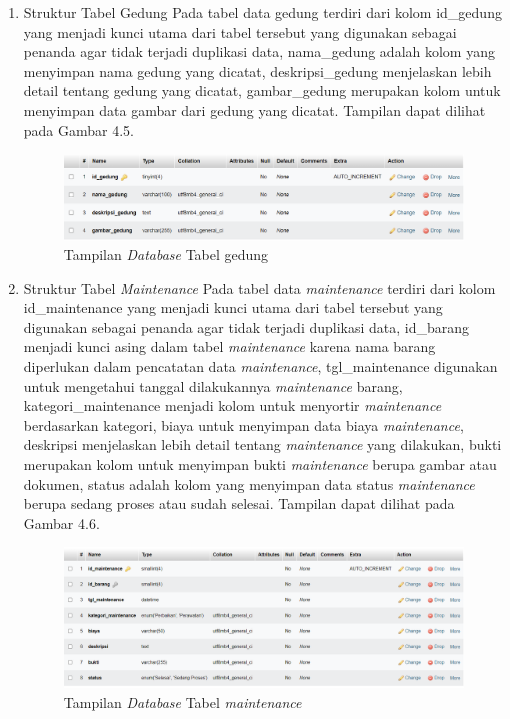 \begin{enumerate}
  \item Struktur Tabel Gedung
        Pada tabel data gedung terdiri dari kolom id\_gedung yang menjadi kunci utama dari tabel tersebut yang digunakan sebagai penanda agar tidak terjadi duplikasi data, nama\_gedung adalah kolom yang menyimpan nama gedung yang dicatat,  deskripsi\_gedung menjelaskan lebih detail tentang gedung yang dicatat, gambar\_gedung merupakan kolom untuk menyimpan data gambar dari gedung yang dicatat. Tampilan dapat dilihat pada Gambar 4.5.

        \begin{figure}
          \centering
          \includegraphics[width=0.82\linewidth]{konten//gambar/Tampilan database tabel gedung.png}
          \caption{Tampilan \textit{Database} Tabel gedung}
          \label{fig:enter-label}
        \end{figure}

  \item Struktur Tabel \textit{Maintenance}
        Pada tabel data \textit{maintenance} terdiri dari kolom id\_maintenance yang menjadi kunci utama dari tabel tersebut yang digunakan sebagai penanda agar tidak terjadi duplikasi data, id\_barang menjadi kunci asing dalam tabel \textit{maintenance} karena nama barang diperlukan dalam pencatatan data \textit{maintenance}, tgl\_maintenance digunakan untuk mengetahui tanggal dilakukannya \textit{maintenance} barang, kategori\_maintenance menjadi kolom untuk menyortir \textit{maintenance} berdasarkan kategori, biaya untuk menyimpan data biaya \textit{maintenance}, deskripsi menjelaskan lebih detail tentang \textit{maintenance} yang dilakukan, bukti merupakan kolom untuk menyimpan bukti \textit{maintenance} berupa gambar atau dokumen, status adalah kolom yang menyimpan data status \textit{maintenance} berupa sedang proses atau sudah selesai. Tampilan dapat dilihat pada Gambar 4.6.

        \begin{figure}
          \centering
          \includegraphics[width=0.82\linewidth]{konten//gambar/Tampilan database tabel maintenance.png}
          \caption{Tampilan \textit{Database} Tabel \textit{maintenance}}
          \label{fig:enter-label}
        \end{figure}


\end{enumerate}
